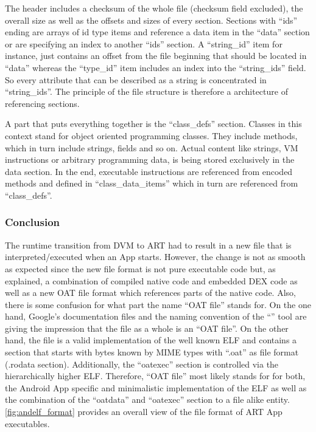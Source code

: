 The header includes a checksum of the whole file (checksum
field excluded), the overall size as well as the offsets and sizes
of every section. Sections with ``ids'' ending are arrays of
id type items and reference
a data item in the ``data'' section or are specifying
an index to another ``ids'' section. A ``string\_id'' item for
instance, just contains an offset from the file beginning
that should be located in ``data'' whereas the ``type\_id'' item
includes an index into the ``string\_ids'' field. So every
attribute that can be described as a string is concentrated in
``string\_ids''. The principle of the file structure is therefore a architecture of referencing
sections.

A part that puts everything together is the ``class\_defs''
section. Classes in this context stand for object oriented programming classes. They include methods, which in turn include strings, fields and so on. Actual content like
strings, VM instructions or arbitrary programming data, is being stored exclusively in the data section. In the end, executable instructions are referenced from encoded methods and defined in ``class\_data\_items'' which in turn are referenced from ``class\_defs''.


\subsubsection{Conclusion}\label{section:andelf_format_conclusion}
The runtime transition from DVM to ART had to result
in a new file that is interpreted/executed when an App starts.
However, the change is not as smooth as expected since
the new file format is not pure executable code but, as
explained, a combination of compiled native code
and embedded DEX code as well as a new OAT file format
which references parts of the native code. Also, there is some
confusion for what part the name ``OAT file'' stands for. On the
one hand, Google's documentation files and the naming
convention of the ``'' tool are giving the impression
that the file as a whole is an ``OAT file''. On
the other hand, the file is a valid implementation of the
well known ELF and contains a section that starts
with bytes known by MIME types with ``.oat'' as file format
(.rodata section). Additionally, the ``oatexec'' section
is controlled via the hierarchically higher ELF. Therefore, ``OAT file'' most likely stands for for both, the
Android App specific and minimalistic implementation of the ELF
as well as the combination of the ``oatdata'' and ``oatexec''
section to a file alike entity. \autoref{fig:andelf_format}
provides an overall view of the file format of ART App executables.


